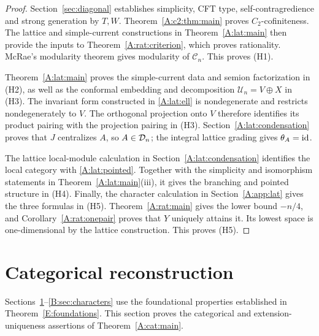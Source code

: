 \documentclass[11pt]{article}
\numberwithin{equation}{section}
\begin{document}
\begin{proof}
Section~\ref{sec:diagonal} establishes simplicity, CFT type, self-contragredience and strong generation by $T,W$. Theorem~\ref{A:c2:thm:main} proves $C_2$-cofiniteness. The lattice and simple-current constructions in Theorem~\ref{A:lat:main} then provide the inputs to Theorem~\ref{A:rat:criterion}, which proves rationality. McRae's modularity theorem \cite[Main Theorem~3]{A:McR} gives modularity of $\mathcal C_n$. This proves \textup{(H1)}.

Theorem~\ref{A:lat:main} proves the simple-current data and semion factorization in \textup{(H2)}, as well as the conformal embedding and decomposition $\mathcal U_n=V\oplus X$ in \textup{(H3)}. The invariant form constructed in \eqref{A:lat:ell} is nondegenerate and restricts nondegenerately to $V$. The orthogonal projection onto $V$ therefore identifies its product pairing with the projection pairing in \textup{(H3)}. Section~\ref{A:lat:condensation} proves that $J$ centralizes $A$, so $A\in\mathcal D_n$; the integral lattice grading gives $\theta_A=\operatorname{id}$.

The lattice local-module calculation in Section~\ref{A:lat:condensation} identifies the local category with \eqref{A:lat:pointed}. Together with the simplicity and isomorphism statements in Theorem~\ref{A:lat:main}(iii), it gives the branching and pointed structure in \textup{(H4)}. Finally, the character calculation in Section~\ref{A:app:lat} gives the three formulas in \textup{(H5)}. Theorem~\ref{A:rat:main} gives the lower bound $-n/4$, and Corollary~\ref{A:rat:onepair} proves that $Y$ uniquely attains it. Its lowest space is one-dimensional by the lattice construction. This proves \textup{(H5)}.
\end{proof}

\section{Categorical reconstruction}\label{A:sec:categorical}
Sections~\ref{A:sec:categorical}--\ref{B:sec:characters} use the foundational properties established in Theorem~\ref{E:foundations}. This section proves the categorical and extension-uniqueness assertions of Theorem~\ref{A:cat:main}.
\end{document}
